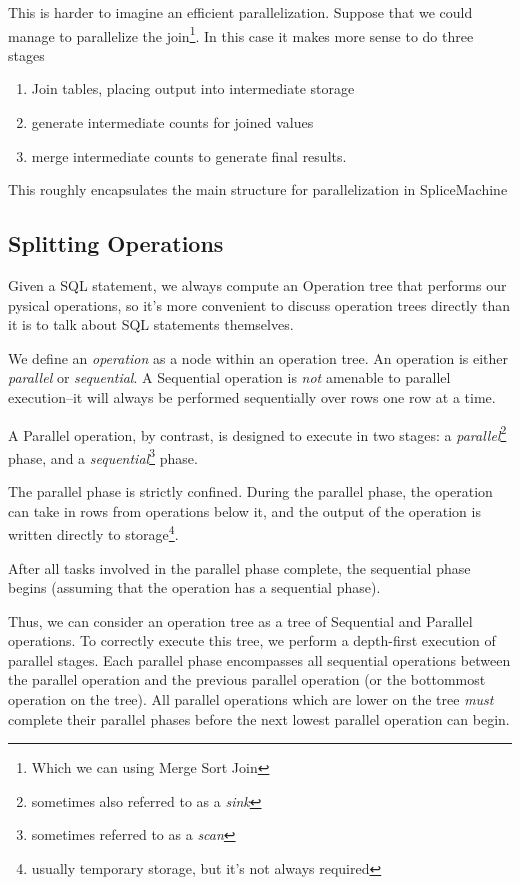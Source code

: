 This is harder to imagine an efficient parallelization. Suppose that we could manage to parallelize the join\footnote{Which we can using Merge Sort Join}. In this case it makes more sense to do three stages

\begin{enumerate}
\item Join tables, placing output into intermediate storage
\item generate intermediate counts for joined values
\item merge intermediate counts to generate final results.
\end{enumerate}

This roughly encapsulates the main structure for parallelization in SpliceMachine

\subsection{Splitting Operations}
Given a SQL statement, we always compute an Operation tree that performs our pysical operations, so it's more convenient to discuss operation trees directly than it is to talk about SQL statements themselves.

We define an \emph{operation} as a node within an operation tree. An operation is either \emph{parallel} or \emph{sequential}. A Sequential operation is \emph{not} amenable to parallel execution--it will always be performed sequentially over rows one row at a time.

A Parallel operation, by contrast, is designed to execute in two stages: a \emph{parallel}\footnote{sometimes also referred to as a \emph{sink}} phase, and a \emph{sequential}\footnote{sometimes referred to as a \emph{scan}} phase. 

The parallel phase is strictly confined. During the parallel phase, the operation can take in rows from operations below it, and the output of the operation is written directly to storage\footnote{usually temporary storage, but it's not always required}. 

After all tasks involved in the parallel phase complete, the sequential phase begins (assuming that the operation has a sequential phase).

Thus, we can consider an operation tree as a tree of Sequential and Parallel operations. To correctly execute this tree, we perform a depth-first execution of parallel stages. Each parallel phase encompasses all sequential operations between the parallel operation and the previous parallel operation (or the bottommost operation on the tree). All parallel operations which are lower on the tree \emph{must} complete their parallel phases before the next lowest parallel operation can begin.

